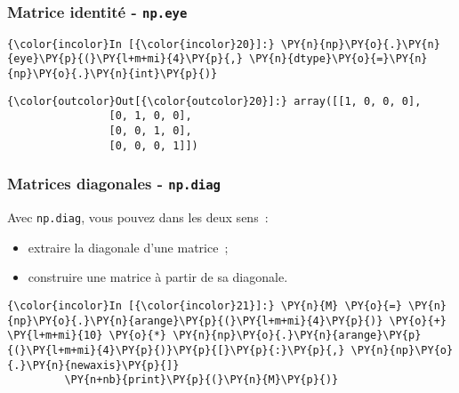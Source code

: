    \hypertarget{matrice-identituxe9---np.eye}{%
\subsubsection{\texorpdfstring{Matrice identité -
\texttt{np.eye}}{Matrice identité - np.eye}}\label{matrice-identituxe9---np.eye}}

    \begin{Verbatim}[commandchars=\\\{\},frame=single,framerule=0.3mm,rulecolor=\color{cellframecolor}]
{\color{incolor}In [{\color{incolor}20}]:} \PY{n}{np}\PY{o}{.}\PY{n}{eye}\PY{p}{(}\PY{l+m+mi}{4}\PY{p}{,} \PY{n}{dtype}\PY{o}{=}\PY{n}{np}\PY{o}{.}\PY{n}{int}\PY{p}{)}
\end{Verbatim}


\begin{Verbatim}[commandchars=\\\{\},frame=single,framerule=0.3mm,rulecolor=\color{cellframecolor}]
{\color{outcolor}Out[{\color{outcolor}20}]:} array([[1, 0, 0, 0],
                [0, 1, 0, 0],
                [0, 0, 1, 0],
                [0, 0, 0, 1]])
\end{Verbatim}
            
    \hypertarget{matrices-diagonales---np.diag}{%
\subsubsection{\texorpdfstring{Matrices diagonales -
\texttt{np.diag}}{Matrices diagonales - np.diag}}\label{matrices-diagonales---np.diag}}

    Avec \texttt{np.diag}, vous pouvez dans les deux sens~:

\begin{itemize}
\item
  extraire la diagonale d'une matrice~;
\item
  construire une matrice à partir de sa diagonale.
\end{itemize}

    \begin{Verbatim}[commandchars=\\\{\},frame=single,framerule=0.3mm,rulecolor=\color{cellframecolor}]
{\color{incolor}In [{\color{incolor}21}]:} \PY{n}{M} \PY{o}{=} \PY{n}{np}\PY{o}{.}\PY{n}{arange}\PY{p}{(}\PY{l+m+mi}{4}\PY{p}{)} \PY{o}{+} \PY{l+m+mi}{10} \PY{o}{*} \PY{n}{np}\PY{o}{.}\PY{n}{arange}\PY{p}{(}\PY{l+m+mi}{4}\PY{p}{)}\PY{p}{[}\PY{p}{:}\PY{p}{,} \PY{n}{np}\PY{o}{.}\PY{n}{newaxis}\PY{p}{]}
         \PY{n+nb}{print}\PY{p}{(}\PY{n}{M}\PY{p}{)}
\end{Verbatim}


